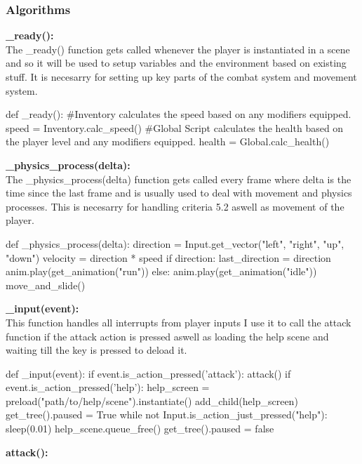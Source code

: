 \documentclass{article}
\begin{document}
        \subsubsection{Algorithms}
        \textbf{\_ready():}\\
        The \_ready() function gets called whenever the player is instantiated in a scene and so it will be used to setup variables and the environment based on existing stuff. It is necesarry for setting up key parts of the combat system and movement system.\\
        \begin{python}
def _ready():
        #Inventory calculates the speed based on any modifiers equipped.
        speed = Inventory.calc_speed() 
        #Global Script calculates the health based on the player level and any modifiers equipped.
        health = Global.calc_health()
        \end{python}
        \textbf{\_physics\_process(delta):}\\
        The \_physics\_process(delta) function gets called every frame where delta is the time since the last frame and is usually used to deal with movement and physics processes. This is necesarry for handling criteria 5.2 aswell as movement of the player.\\
        \begin{python}
def _physics_process(delta):
   direction = Input.get_vector("left", "right", "up", "down")
   velocity = direction * speed
   if direction:
      last_direction = direction
      anim.play(get_animation("run"))
   else:
      anim.play(get_animation("idle"))
   move_and_slide()
        \end{python}
        \textbf{\_input(event):}\\
        This function handles all interrupts from player inputs I use it to call the attack function if the attack action is pressed aswell as loading the help scene and waiting till the key is pressed to deload it.\\ 
        \begin{python}
def _input(event):
   if event.is_action_pressed('attack'):
      attack()
   if event.is_action_pressed('help'):
      help_screen = preload("path/to/help/scene").instantiate()
      add_child(help_screen)
      get_tree().paused = True
      while not Input.is_action_just_pressed("help"):
         sleep(0.01)
      help_scene.queue_free()
      get_tree().paused = false
        \end{python}
        \textbf{attack():}\\
\end{document}
